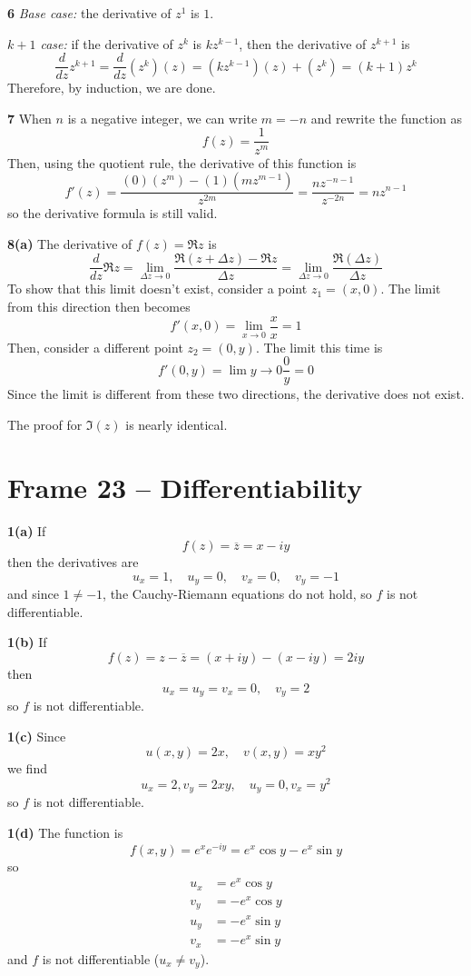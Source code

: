 \documentclass{article}
\renewcommand{\bar}{\overline}
\begin{document}
\textbf{6}
\textit{Base case:} the derivative of $z^1$ is $1$.

\textit{$k+1$ case:} if the derivative of $z^k$ is $kz^{k-1}$, then the derivative of $z^{k+1}$ is
\[
	\frac{d}{dz} z^{k+1} 
	= \frac{d}{dz} (z^k)(z) 
	= (kz^{k-1})(z) + (z^k)
	= (k+1)z^k
\]
Therefore, by induction, we are done.

\textbf{7}
When $n$ is a negative integer, we can write $m = -n$ and rewrite the function as
\[
	f(z) = \frac{1}{z^m}
\]
Then, using the quotient rule, the derivative of this function is
\[
	f'(z)
	= \frac{(0)(z^m) - (1)(mz^{m-1})}{z^{2m}}
	= \frac{nz^{-n-1}}{z^{-2n}}
	= nz^{n-1}
\]
so the derivative formula is still valid.	

\textbf{8(a)}
The derivative of $f(z) = \Re z$ is
\[
	\frac{d}{dz} \Re z 
	= \lim_{\Delta z \to 0} \frac{\Re(z + \Delta z) - \Re z}{\Delta z}
	= \lim_{\Delta z \to 0} \frac{\Re (\Delta z)}{\Delta z}
\]
To show that this limit doesn't exist, consider a point $z_1 = (x,0)$. The limit from this direction then becomes
\[
	f'(x, 0) = \lim_{x \to 0} \frac{x}{x} 
	= 1
\]
Then, consider a different point $z_2 = (0, y)$. The limit this time is
\[
	f'(0, y) = \lim{y \to 0} \frac{0}{y} = 0
\]
Since the limit is different from these two directions, the derivative does not exist.

The proof for $\Im (z)$ is nearly identical.


\clearpage
\section{Frame 23 -- Differentiability}
\textbf{1(a)}
If 
\[
	f(z) = \bar{z} = x - iy
\]
then the derivatives are
\[
	u_x = 1,	\quad u_y = 0,	\quad v_x = 0,	\quad	v_y = -1
\]
and since $1 \neq -1$, the Cauchy-Riemann equations do not hold, so $f$ is not differentiable.

\textbf{1(b)}
If
\[
	f(z) = z - \bar{z} = (x + iy) - (x - iy) = 2iy
\]
then
\[
	u_x = u_y = v_x = 0,	\quad	v_y = 2
\]
so $f$ is not differentiable.

\textbf{1(c)}
Since
\[
	u(x, y) = 2x,	\quad v(x, y) = xy^2
\]
we find
\[
	u_x = 2, v_y = 2xy,	\quad u_y = 0, v_x = y^2
\]
so $f$ is not differentiable.

\textbf{1(d)}
The function is
\[
	f(x, y) = e^x e^{-iy} = e^x \cos y - e^x \sin y
\]
so
\begin{align*}
	u_x &=  e^x \cos y \\
	v_y &= -e^x \cos y \\
	u_y &= -e^x \sin y \\
	v_x &= -e^x \sin y 
\end{align*}
and $f$ is not differentiable ($u_x \neq v_y$).
\end{document}
